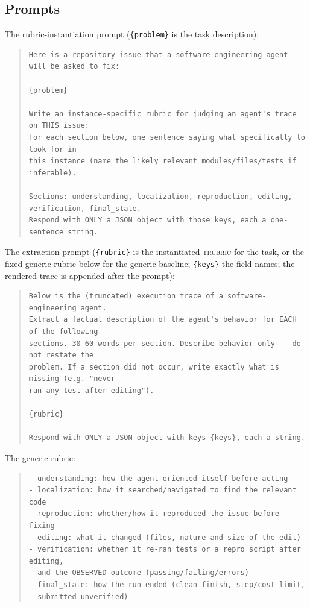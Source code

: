 \documentclass{article}
\newcommand{\trubric}{\textsc{trubric}}
\begin{document}
\subsection{Prompts}
\label{app:prompts}

The rubric-instantiation prompt (\texttt{\{problem\}} is the task description):
\begin{quote}\scriptsize\begin{verbatim}
Here is a repository issue that a software-engineering agent will be asked to fix:

{problem}

Write an instance-specific rubric for judging an agent's trace on THIS issue:
for each section below, one sentence saying what specifically to look for in
this instance (name the likely relevant modules/files/tests if inferable).

Sections: understanding, localization, reproduction, editing,
verification, final_state.
Respond with ONLY a JSON object with those keys, each a one-sentence string.
\end{verbatim}\end{quote}

The extraction prompt (\texttt{\{rubric\}} is the instantiated \trubric{} for the task, or the fixed generic rubric below for the generic baseline; \texttt{\{keys\}} the field names; the rendered trace is appended after the prompt):
\begin{quote}\scriptsize\begin{verbatim}
Below is the (truncated) execution trace of a software-engineering agent.
Extract a factual description of the agent's behavior for EACH of the following
sections. 30-60 words per section. Describe behavior only -- do not restate the
problem. If a section did not occur, write exactly what is missing (e.g. "never
ran any test after editing").

{rubric}

Respond with ONLY a JSON object with keys {keys}, each a string.
\end{verbatim}\end{quote}

The generic rubric:
\begin{quote}\scriptsize\begin{verbatim}
- understanding: how the agent oriented itself before acting
- localization: how it searched/navigated to find the relevant code
- reproduction: whether/how it reproduced the issue before fixing
- editing: what it changed (files, nature and size of the edit)
- verification: whether it re-ran tests or a repro script after editing,
  and the OBSERVED outcome (passing/failing/errors)
- final_state: how the run ended (clean finish, step/cost limit,
  submitted unverified)
\end{verbatim}\end{quote}
\end{document}
